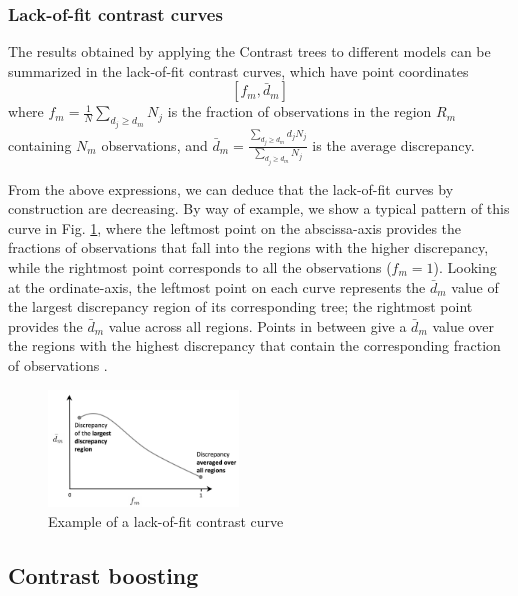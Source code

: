 \documentclass[a4,11pt]{article}
\begin{document}
\subsubsection{Lack-of-fit contrast curves}

The results obtained by applying the Contrast trees to different models can be summarized in the lack-of-fit contrast curves, which have point coordinates 
$$[f_m,\bar{d}_m]$$
where $f_m=\frac{1}{N}\sum_{d_j\geq d_m}N_j$ is the fraction of observations in the region $R_m$ containing $N_m$ observations, and $\bar{d}_m=\frac{\sum_{d_j\geq d_m}d_j N_j}{\sum_{d_j\geq d_m}N_j}$ is the average discrepancy.

From the above expressions, we can deduce that the lack-of-fit curves by construction are decreasing. By way of example, we show a typical pattern of this curve in Fig. \ref{fig:lof-ex}, where the leftmost point on the abscissa-axis provides the fractions of observations that fall into the regions with the higher discrepancy, while the rightmost point corresponds to all the observations ($f_m=1$).
Looking at the ordinate-axis, the leftmost point on each curve represents the $\bar{d}_m$ value of the largest discrepancy region of its corresponding tree; the rightmost point provides the $\bar{d}_m$ value across all regions. Points in between give a $\bar{d}_m$ value over the regions with the highest discrepancy that contain the corresponding fraction of observations \cite{Friedman2020}.
\begin{figure}[ht]
\centering
\includegraphics[width=0.45\textwidth]{lof_example.png}
\caption{Example of a lack-of-fit contrast curve}
\label{fig:lof-ex}
\end{figure}

\subsection{Contrast boosting}
\end{document}
